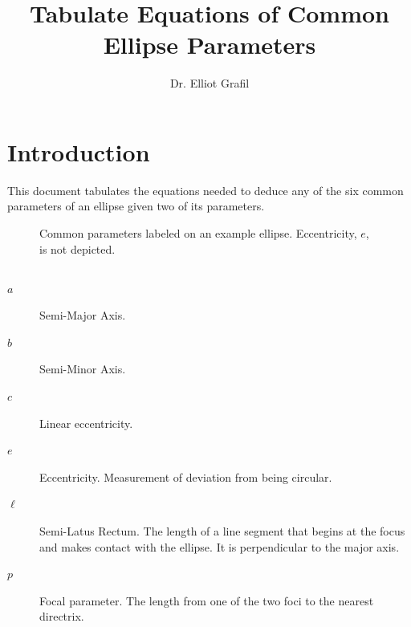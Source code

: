 \documentclass{article}
\title{\vspace{-2.5cm}Tabulate Equations of Common Ellipse Parameters}
\author{Dr. Elliot Grafil}
\begin{document}
\maketitle
\section*{Introduction}
This document tabulates the equations needed to deduce any of the six common parameters of an ellipse given two of its parameters. 
\begin{figure}[H]
\begin{center}
\noindent{}
  \caption{Common parameters labeled on an example ellipse. Eccentricity, $e$, is not depicted.}
  \label{fig:boat1}
  \end{center}
\end{figure}
\subsection*{}
\begin{description}
\item[$a$] Semi-Major Axis.
\item[$b$] Semi-Minor Axis.
\item[$c$] Linear eccentricity.
\item[$e$] Eccentricity. Measurement of deviation from being circular.
\item[$\ell$] Semi-Latus Rectum. The length of a line segment that begins at the focus and makes contact with the ellipse. It is perpendicular to the major axis.
\item[$p$] Focal parameter. The length from one of the two foci to the nearest directrix. 
\end{description}
\end{document}
